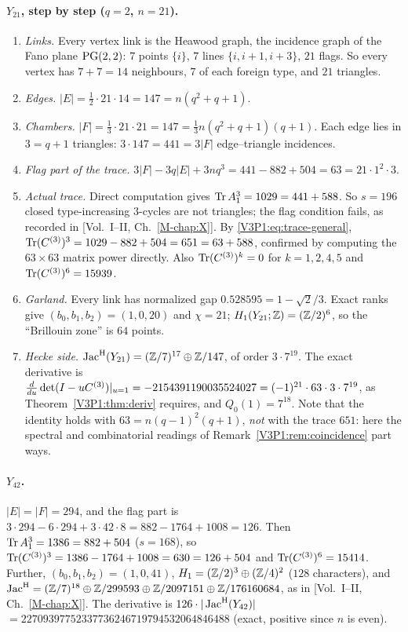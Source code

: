 \paragraph{$Y_{21}$, step by step ($q=2$, $n=21$).}
\begin{enumerate}
\item \emph{Links.} Every vertex link is the Heawood graph, the incidence graph of the Fano
plane $\mathrm{PG}(2,2)$: $7$ points $\{i\}$, $7$ lines $\{i,i+1,i+3\}$, $21$ flags. So every vertex
has $7+7=14$ neighbours, $7$ of each foreign type, and $21$ triangles.
\item \emph{Edges.} $|E|=\tfrac12\cdot21\cdot14=147=n(q^{2}+q+1)$.
\item \emph{Chambers.} $|F|=\tfrac13\cdot21\cdot21=147=\tfrac13n(q^{2}+q+1)(q+1)$. Each edge
lies in $3=q+1$ triangles: $3\cdot147=441=3|F|$ edge--triangle incidences.
\item \emph{Flag part of the trace.} $3|F|-3q|E|+3nq^{3}=441-882+504=63=21\cdot1^{2}\cdot3$.
\item \emph{Actual trace.} Direct computation gives $\operatorname{Tr} A_1^{3}=1029=441+588$. So $s=196$
closed type-increasing $3$-cycles are not triangles; the flag condition fails, as recorded in
[Vol.~I--II, Ch.~\ref{M-chap:X}]. By \eqref{V3P1:eq:trace-general},
$\operatorname{Tr}(C^{(3)})^{3}=1029-882+504=651=63+588$, confirmed by computing the $63\times63$ matrix
power directly. Also $\operatorname{Tr}(C^{(3)})^{k}=0$ for $k=1,2,4,5$ and $\operatorname{Tr}(C^{(3)})^{6}=15939$.
\item \emph{Garland.} Every link has normalized gap $0.528595=1-\sqrt2/3$. Exact ranks give
$(b_0,b_1,b_2)=(1,0,20)$ and $\chi=21$; $H_1(Y_{21};\mathbb{Z})=(\mathbb{Z}/2)^{6}$, so the ``Brillouin zone''
is $64$ points.
\item \emph{Hecke side.} $\operatorname{Jac}^{\mathrm{H}}(Y_{21})=(\mathbb{Z}/7)^{17}\oplus\mathbb{Z}/147$, of order $3\cdot7^{19}$.
The exact derivative is $\frac{d}{du}\det(I-uC^{(3)})|_{u=1}=-2154391190035524027
=(-1)^{21}\cdot63\cdot3\cdot7^{19}$, as Theorem~\ref{V3P1:thm:deriv} requires, and
$Q_0(1)=7^{18}$. Note that the identity holds with $63=n(q-1)^{2}(q+1)$, \emph{not} with the
trace $651$: here the spectral and combinatorial readings of Remark~\ref{V3P1:rem:coincidence}
part ways.
\end{enumerate}

\paragraph{$Y_{42}$.} $|E|=|F|=294$, and the flag part is $3\cdot294-6\cdot294+3\cdot42\cdot8
=882-1764+1008=126$. Then $\operatorname{Tr} A_1^{3}=1386=882+504$ ($s=168$), so
$\operatorname{Tr}(C^{(3)})^{3}=1386-1764+1008=630=126+504$ and $\operatorname{Tr}(C^{(3)})^{6}=15414$. Further,
$(b_0,b_1,b_2)=(1,0,41)$, $H_1=(\mathbb{Z}/2)^{3}\oplus(\mathbb{Z}/4)^{2}$ ($128$ characters), and
$\operatorname{Jac}^{\mathrm{H}}=(\mathbb{Z}/7)^{18}\oplus\mathbb{Z}/299593\oplus\mathbb{Z}/2097151\oplus\mathbb{Z}/176160684$, as in
[Vol.~I--II, Ch.~\ref{M-chap:X}]. The derivative is $126\cdot|\operatorname{Jac}^{\mathrm{H}}(Y_{42})|$
$=22709397752337736246719794532064846488$ (exact, positive since $n$ is even).

